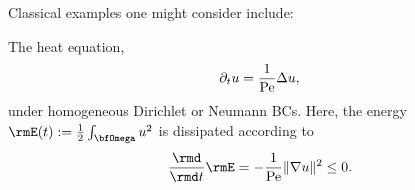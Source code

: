     \line
    
    Classical examples one might consider include:
    \begin{example}
        The heat equation,
        \begin{equation}\label{eqn:heat equation}
            \partial_{t}u  =  \frac{1}{\mathrm{Pe}}\Delta u,
        \end{equation}
        under homogeneous Dirichlet or Neumann BCs. Here, the energy $\rmE(t)  :=  \frac{1}{2}\int_{\bfOmega}u^{2}$ is dissipated according to
        \begin{equation}\label{eqn:heat equation dissipation}
            \frac{\rmd}{\rmd t}\rmE  =  - \frac{1}{\rmPe}\|\nabla u\|^{2}  \leq  0.
        \end{equation}
    \end{example}
    
